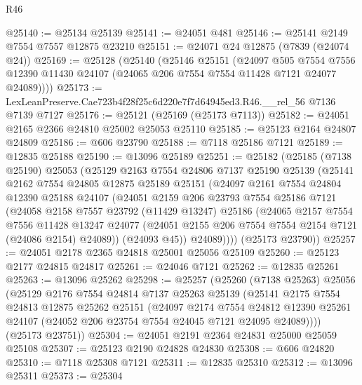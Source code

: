 \begin{lexlean}{R46}
\begin{coremodule}
@25140 := @25134 @25139
@25141 := @24051 @481
@25146 := @25141 @2149 @7554 @7557 @12875 @23210
@25151 := @24071 @24 @12875 (@7839 (@24074 @24))
@25169 := @25128
    (@25140
      (@25146
        @25151
        (@24097
          @505
          @7554
          @7556
          @12390
          @11430
          @24107
          (@24065 @206 @7554 @7554 @11428 @7121 @24077 @24089))))
@25173 := LexLeanPreserve.Cae723b4f28f25c6d220e7f7d64945ed3.R46.__rel_56 @7136 @7139 @7127
@25176 := @25121 (@25169 (@25173 @7113))
@25182 := @24051 @2165 @2366 @24810 @25002 @25053 @25110
@25185 := @25123 @2164 @24807 @24809
@25186 := @606 @23790
@25188 := @7118 @25186 @7121
@25189 := @12835 @25188
@25190 := @13096 @25189
@25251 := @25182
    (@25185
      (@7138 @25190)
      @25053
      (@25129
        @2163
        @7554
        @24806
        @7137
        @25190
        @25139
        (@25141
          @2162
          @7554
          @24805
          @12875
          @25189
          @25151
          (@24097
            @2161
            @7554
            @24804
            @12390
            @25188
            @24107
            (@24051
              @2159
              @206
              @23793
              @7554
              @25186
              @7121
              (@24058
                @2158
                @7557
                @23792
                (@11429 @13247)
                @25186
                (@24065
                  @2157
                  @7554
                  @7556
                  @11428
                  @13247
                  @24077
                  (@24051 @2155 @206 @7554 @7554 @2154 @7121 (@24086 @2154) @24089))
                (@24093 @45))
              @24089))))
      (@25173 @23790))
@25257 := @24051 @2178 @2365 @24818 @25001 @25056 @25109
@25260 := @25123 @2177 @24815 @24817
@25261 := @24046 @7121
@25262 := @12835 @25261
@25263 := @13096 @25262
@25298 := @25257
    (@25260
      (@7138 @25263)
      @25056
      (@25129
        @2176
        @7554
        @24814
        @7137
        @25263
        @25139
        (@25141
          @2175
          @7554
          @24813
          @12875
          @25262
          @25151
          (@24097
            @2174
            @7554
            @24812
            @12390
            @25261
            @24107
            (@24052 @206 @23754 @7554 @24045 @7121 @24095 @24089))))
      (@25173 @23751))
@25304 := @24051 @2191 @2364 @24831 @25000 @25059 @25108
@25307 := @25123 @2190 @24828 @24830
@25308 := @606 @24820
@25310 := @7118 @25308 @7121
@25311 := @12835 @25310
@25312 := @13096 @25311
@25373 := @25304

\end{coremodule}
\end{lexlean}
